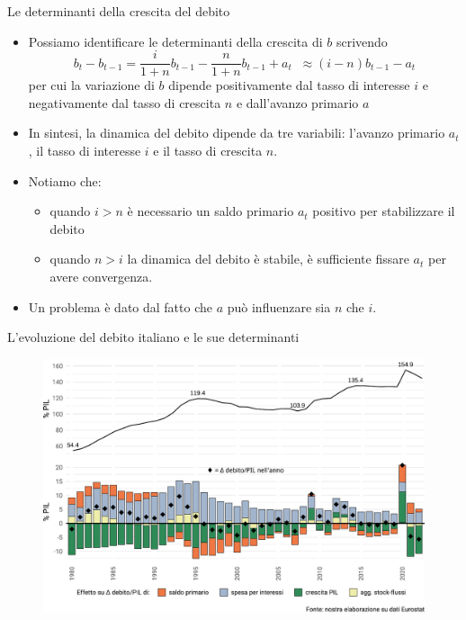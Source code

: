 \documentclass[aspectratio=64,11pt]{beamer}
\begin{document}
\begin{frame}{Le determinanti della crescita del debito}

  \begin{itemize}
  \item Possiamo identificare le determinanti della crescita di $b$ scrivendo
    \begin{equation*}
      b_{t}-b_{t-1}=\frac{i}{1+n}b_{t-1}-\frac{n}{1+n}b_{t-1}+a_{t}
      \;\;\approx (i-n)b_{t-1}-a_{t}
    \end{equation*}
    per cui la variazione di $b$ dipende positivamente dal tasso di interesse
    $i$ e negativamente dal tasso di crescita $n$ e dall'avanzo primario $a$
  \item In sintesi, la dinamica del debito dipende da tre variabili: l'avanzo
    primario $a_t$, il tasso di interesse $i$ e il tasso di crescita $n$.
  \item Notiamo che:
    \begin{itemize}
    \item quando $i>n$ è necessario un saldo primario $a_t$ positivo per
      stabilizzare il debito
    \item quando $n>i$ la dinamica del debito è stabile, è sufficiente fissare
      $a_t$ per avere convergenza.
    \end{itemize}
  \item Un problema è dato dal fatto che $a$ può influenzare sia $n$ che $i$.
  \end{itemize}
\end{frame}

\begin{frame}{L'evoluzione del debito italiano e le sue determinanti}

  \begin{figure}
    \centering
    \includegraphics[width=.9\textwidth]{./figure/crescita-debito-1980-2024-scomposizione-nominale-color.pdf}
  \end{figure}
\end{frame}
\end{document}
